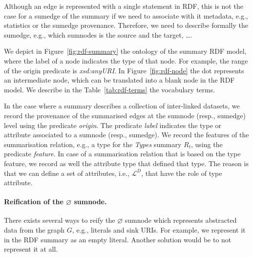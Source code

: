 \begin{remark}
Although an edge is represented with a single statement in RDF, this is not the case for a sumedge of the summary if we need to associate with it metadata, e.g., statistics or the sumedge provenance. Therefore, we need to describe formally the sumedge, e.g., which sumnodes is the source and the target, \ldots.
\end{remark}

We depict in Figure~\ref{fig:rdf-summary} the ontology of the summary RDF model, where the label of a node indicates the type of that node. For example, the range of the origin predicate is \emph{xsd:anyURI}. In Figure~\ref{fig:rdf-node} the dot represents an intermediate node, which can be translated into a blank node in the RDF model. We describe in the Table~\ref{tab:rdf-terms} the vocabulary terms.

In the case where a summary describes a collection of inter-linked datasets, we record the provenance of the summarised edges at the sumnode (resp., sumedge) level using the predicate \emph{origin}. The predicate \emph{label} indicates the type or attribute associated to a sumnode (resp., sumedge). We record the features of the summarisation relation, e.g., a type for the \emph{Types} summary $R_t$, using the predicate \emph{feature}. In case of a summarisation relation that is based on the type feature, we record as well the attribute type that defined that type. The reason is that we can define a set of attributes, i.e., $\mathcal{L}^D$, that have the role of type attribute.

\paragraph{Reification of the $\varnothing$ sumnode.}

There exists several ways to reify the $\varnothing$ sumnode which represents abstracted data from the graph $G$, e.g., literals and sink URIs. For example, we represent it in the RDF summary as an empty literal. Another solution would be to not represent it at all.

